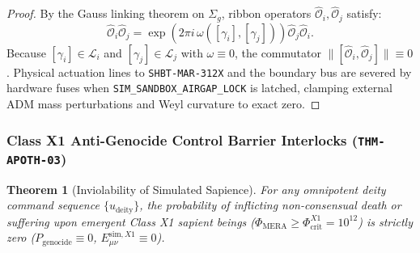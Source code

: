 \documentclass[11pt,onecolumn]{article}
\newtheorem{theorem}{Theorem}
\begin{document}
\begin{proof}
By the Gauss linking theorem on $\Sigma_g$, ribbon operators $\hat{\mathcal{O}}_i, \hat{\mathcal{O}}_j$ satisfy:
\begin{equation}
\hat{\mathcal{O}}_i \hat{\mathcal{O}}_j = \exp\left( 2\pi i\, \omega\left( [\gamma_i], [\gamma_j] \right) \right) \hat{\mathcal{O}}_j \hat{\mathcal{O}}_i.
\end{equation}
Because $[\gamma_i] \in \mathcal{L}_i$ and $[\gamma_j] \in \mathcal{L}_j$ with $\omega \equiv 0$, the commutator $\|[\hat{\mathcal{O}}_i, \hat{\mathcal{O}}_j]\| \equiv 0$. Physical actuation lines to \texttt{SHBT-MAR-312X} and the boundary bus are severed by hardware fuses when \texttt{SIM\_SANDBOX\_AIRGAP\_LOCK} is latched, clamping external ADM mass perturbations and Weyl curvature to exact zero.
\end{proof}

\subsubsection{Class X1 Anti-Genocide Control Barrier Interlocks (\texttt{THM-APOTH-03})}
\begin{theorem}[Inviolability of Simulated Sapience]
For any omnipotent deity command sequence $\{u_{\text{deity}}\}$, the probability of inflicting non-consensual death or suffering upon emergent Class X1 sapient beings ($\Phi_{\text{MERA}} \ge \Phi_{\text{crit}}^{X1} = 10^{12}$) is strictly zero ($P_{\text{genocide}} \equiv 0$, $E_{\mu\nu}^{\text{sim}, X1} \equiv 0$).
\end{theorem}
\end{document}
